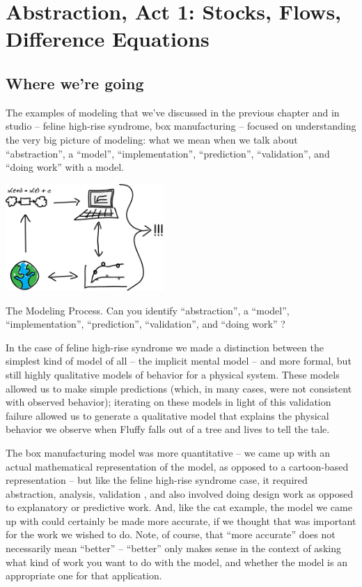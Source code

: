 

\chapter{Abstraction, Act 1: Stocks, Flows, Difference Equations}



\section*{Where we're going}

The examples of modeling that we've discussed in the previous chapter and in studio -- 
feline high-rise syndrome, box manufacturing -- 
focused on understanding the very big picture of modeling:  what we mean when we talk about ``abstraction'', a ``model'', ``implementation'',  ``prediction'', ``validation'', and ``doing work'' with a model.  

\begin{marginfigure}
\includegraphics[width=6cm]{figs/ModsimDiagram}
\caption{The Modeling Process.  Can you identify ``abstraction'', a ``model'', ``implementation'',  ``prediction'', ``validation'', and ``doing work'' ? 
 }
\end{marginfigure}
In the case of feline high-rise syndrome we made a distinction between the simplest kind of model of all -- the implicit mental model -- and more formal, but still highly qualitative models of behavior for a physical system.  These models allowed us to make simple predictions (which, in many cases, were not consistent with observed behavior); iterating on these models in light of this validation failure allowed us to generate a qualitative model that explains the physical behavior we observe when Fluffy falls out of a tree and lives to tell the tale.  

The box manufacturing model was more quantitative -- we came up with an actual mathematical representation of the model, as opposed to a cartoon-based representation -- but like the feline high-rise syndrome case, it required abstraction, analysis, validation , and also involved doing design work as opposed to explanatory or predictive work.  And, like the cat example, the model we came up with could certainly be made more accurate, if we thought that was important for the work we wished to do.  Note, of course, that ``more accurate'' does not necessarily mean ``better'' -- ``better'' only makes sense in the context of asking what kind of work you want to do with the model, and whether the model is an appropriate one for that application.

